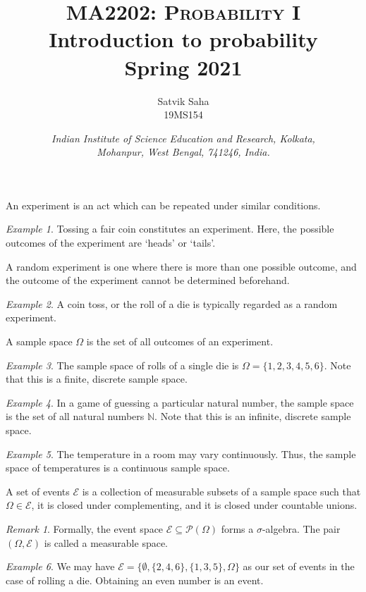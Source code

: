 \documentclass[11pt]{article}
\title{
    \Large\textsc{MA2202: Probability I} \\
    \Huge \textbf{Introduction to probability} \\
    \vspace{5pt}
    \Large{Spring 2021}
}
\author{
    \large Satvik Saha%
    \\\textsc{\small 19MS154}
}
\date{\normalsize
    \textit{Indian Institute of Science Education and Research, Kolkata, \\
    Mohanpur, West Bengal, 741246, India.} \\
}
\def\N{\mathbb{N}}
\theoremstyle{definition}
\theoremstyle{remark}
\newtheorem*{remark}{Remark}
\newtheorem*{example}{Example}
\numberwithin{equation}{module}
\begin{document}
    \maketitle

    \begin{definition}[Experiment]
        An experiment is an act which can be repeated under similar conditions.
    \end{definition}
    \begin{example}
        Tossing a fair coin constitutes an experiment. Here, the possible outcomes
        of the experiment are `heads' or `tails'.
    \end{example}

    \begin{definition}
        A random experiment is one where there is more than one possible outcome, 
        and the outcome of the experiment cannot be determined beforehand.
    \end{definition}
    \begin{example}
        A coin toss, or the roll of a die is typically regarded as a random
        experiment.
    \end{example}
    
    \begin{definition}
        A sample space $\Omega$ is the set of all outcomes of an experiment.
    \end{definition}
    \begin{example}
        The sample space of rolls of a single die is $\Omega = \{1,2,3,4,5,6\}$.
        Note that this is a finite, discrete sample space.
    \end{example}
    \begin{example}
        In a game of guessing a particular natural number, the sample space is the
        set of all natural numbers $\N$. Note that this is an infinite, discrete
        sample space.
    \end{example}
    \begin{example}
        The temperature in a room may vary continuously. Thus, the sample space of
        temperatures is a continuous sample space.
    \end{example}
    
    \begin{definition}[Events]
        A set of events $\mathcal{E}$ is a collection of measurable subsets of
        a sample space such that $\Omega \in \mathcal{E}$, it is closed under
        complementing, and it is closed under countable unions.
    \begin{remark}
        Formally, the event space $\mathcal{E} \subseteq \mathcal{P}(\Omega)$ forms
        a $\sigma$-algebra. The pair $(\Omega, \mathcal{E})$ is called a measurable
        space.
    \end{remark}
    \end{definition}
    \begin{example}
        We may have $\mathcal{E} = \{\emptyset, \{2, 4, 6\}, \{1, 3, 5\},
        \Omega\}$ as our set of events in the case of rolling a die.
        Obtaining an even number is an event.
    \end{example}
\end{document}
